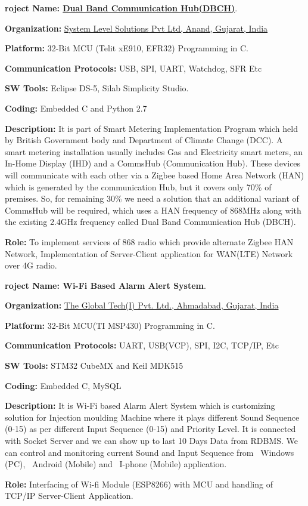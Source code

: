 \begin{itemize}
\vspace{2mm}
\hspace{-10mm} \textbf{\large {\faProductHunt}roject Name: \href{https://www.smartdcc.co.uk/smart-future/dual-band-communications-hubs/}{Dual Band Communication Hub(DBCH)}}.\par
    \textbf{Organization:} \href{http://www.slscorp.com/index.php}{System Level Solutions Pvt Ltd, Anand, Gujarat, India}\par
    \textbf{Platform:} 32-Bit MCU (Telit xE910, EFR32) Programming in C.\par
    \textbf{Communication Protocols:} USB, SPI, UART, Watchdog, SFR Etc\par
    \textbf{SW Tools:} Eclipse DS-5, Silab Simplicity Studio.\par
    \textbf{Coding:} Embedded C and Python 2.7\par
    \textbf{Description:} It is part of Smart Metering Implementation Program which held by British Government body and Department of Climate Change (DCC). A smart metering installation usually includes Gas and Electricity smart meters, an In-Home Display (IHD) and a CommsHub (Communication Hub). These devices will communicate with each other via a Zigbee based Home Area Network (HAN) which is generated by the communication Hub, but it covers only 70\% of premises. So, for remaining 30\% we need a solution that an additional variant of CommsHub will be required, which uses a HAN frequency of 868MHz along with the existing 2.4GHz frequency called Dual Band Communication Hub (DBCH).\par
    \textbf{Role:} To implement services of 868 radio which provide alternate Zigbee HAN Network, Implementation of Server-Client application for WAN(LTE) Network over 4G radio.

\vspace{2mm}
\hspace{-10mm} \textbf{\large {\faProductHunt}roject Name: Wi-Fi Based Alarm Alert System}.\par
    \textbf{Organization:} \href{http://www.thegt.com/}{The Global Tech(I) Pvt. Ltd., Ahmadabad, Gujarat, India}\par
    \textbf{Platform:} 32-Bit MCU(TI MSP430) Programming in C.\par
    \textbf{Communication Protocols:} UART, USB(VCP), SPI, I2C, TCP/IP, Etc\par
    \textbf{SW Tools:} STM32 CubeMX and Keil MDK515\par
    \textbf{Coding:} Embedded C, MySQL\par
    \textbf{Description:} It is Wi-Fi based Alarm Alert System which is customizing solution for Injection moulding Machine where it plays different Sound Sequence (0-15) as per different Input Sequence (0-15) and Priority Level. It is connected with Socket Server and we can show up to last 10 Days Data from RDBMS. We can control and monitoring current Sound and Input Sequence from \faWindows\ Windows (PC), \faAndroid\ Android (Mobile) and \faApple\ I-phone (Mobile) application.\par
    \textbf{Role:} Interfacing of Wi-fi Module (ESP8266) with MCU and handling of TCP/IP Server-Client Application.


\end{itemize}
